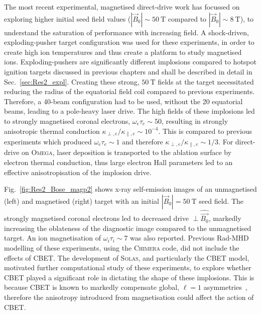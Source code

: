 The most recent experimental, magnetised direct-drive work has focussed on exploring higher initial seed field values ($|\vec{B}_0|\sim50\ \text{T}$ compared to $|\vec{B}_0|\sim8\ \text{T}$), to understand the saturation of performance with increasing field.
A shock-driven, exploding-pusher target configuration was used for these experiments, in order to create high ion temperatures and thus create a platform to study magnetised ions.
Exploding-pushers are significantly different implosions compared to hotspot ignition targets discussed in previous chapters and shall be described in detail in Sec.~\ref{sec:Res2_expl}.
Creating these strong, $50\ \text{T}$ fields at the target necessitated reducing the radius of the equatorial field coil compared to previous experiments.
Therefore, a 40-beam configuration had to be used, without the 20 equatorial beams, leading to a pole-heavy laser drive.
The high fields of these implosions led to strongly magnetised coronal electrons, $\omega_e\tau_e\sim50$, resulting in strongly anisotropic thermal conduction $\kappa_{\perp,e}/\kappa_{\parallel,e}\sim10^{-4}$.
This is compared to previous experiments which produced $\omega_e\tau_e\sim1$ and therefore $\kappa_{\perp,e}/\kappa_{\parallel,e}\sim1/3$.
For direct-drive on \textsc{Omega}, laser deposition is transported to the ablation surface by electron thermal conduction, thus large electron Hall parameters led to an effective anisotropisation of the implosion drive.

Fig.~\ref{fig:Res2_Bose_magp2} shows x-ray self-emission images of an unmagnetised (left) and magnetised (right) target with an initial $|\vec{B}_0|=50\ \text{T}$ seed field.
The strongly magnetised coronal electrons led to decreased drive $\perp\hat{\vec{B_0}}$, markedly increasing the oblateness of the diagnostic image compared to the unmagnetised target.
An ion magnetisation of $\omega_i\tau_i\sim7$ was also reported.
Previous \ac{Rad-MHD} modelling of these experiments, using the \textsc{Chimera} code, did not include the effects of \ac{CBET}.
The development of \textsc{Solas}, and particularly the \ac{CBET} model, motivated further computational study of these experiments, to explore whether \ac{CBET} played a significant role in dictating the shape of these implosions.
This is because \ac{CBET} is known to markedly compensate global, $\ell=1$ asymmetries~\cite{anderson_effect_2020,colaitis_inverse_2021}, therefore the anisotropy introduced from magnetisation could affect the action of \ac{CBET}.

